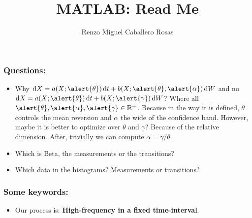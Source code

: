 \documentclass[aspectratio=169]{beamer}\usepackage[utf8]{inputenc}
\title{MATLAB: Read Me}
\subtitle{Renzo Miguel Caballero Rosas}
\newcommand{\R}{\mathbb{R}}
\begin{document}

\begin{frame}
\titlepage
\end{frame}


\begin{frame}\frametitle{Questions:}

\begin{itemize}

\item Why $\dif X=a(X;\alert{\theta})\dif t+b(X;\alert{\theta},\alert{\alpha})\dif W$ and no $\dif X=a(X;\alert{\theta})\dif t+b(X;\alert{\gamma})\dif W$? Where all $\alert{\theta},\alert{\alpha},\alert{\gamma}\in\R^+$. {\color{green}Because in the way it is defined, $\theta$ controls the mean reversion and $\alpha$ the wide of the confidence band.} {\color{red} However, maybe it is better to optimize over $\theta$ and $\gamma$? Because of the relative dimension. After, trivially we can compute $\alpha=\gamma/\theta$}.

\item Which is Beta, the measurements or the transitions? 

\item Which data in the histograms? Measurements or transitions? 

\end{itemize}

\end{frame}


\begin{frame}\frametitle{Some keywords:}

\begin{itemize}

\item Our process is: \textbf{High-frequency in a fixed time-interval}.

\end{itemize}

\end{frame}
\end{document}

